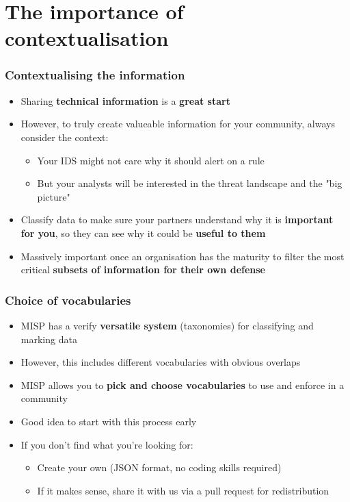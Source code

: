 \section{The importance of \\ contextualisation}

\begin{frame}
\frametitle{Contextualising the information}
\begin{itemize}
    \item Sharing \textbf{technical information} is a \textbf{great start}
	\item However, to truly create valueable information for your community, always consider the context:
	\begin{itemize}
		\item Your IDS might not care why it should alert on a rule
		\item But your analysts will be interested in the threat landscape and the "big picture"
	\end{itemize}
    \item Classify data to make sure your partners understand why it is \textbf{important for you}, so they can see why it could be \textbf{useful to them}
    \item Massively important once an organisation has the maturity to filter the most critical \textbf{subsets of information for their own defense}
\end{itemize}
\end{frame}

\begin{frame}
\frametitle{Choice of vocabularies}
\begin{itemize}
    \item MISP has a verify \textbf{versatile system} (taxonomies) for classifying and marking data
	\item However, this includes different vocabularies with obvious overlaps
    \item MISP allows you to \textbf{pick and choose vocabularies} to use and enforce in a community
	\item Good idea to start with this process early
	\item If you don't find what you're looking for:
	\begin{itemize}
		\item Create your own (JSON format, no coding skills required)
		\item If it makes sense, share it with us via a pull request for redistribution
	\end{itemize}
\end{itemize}
\end{frame}


